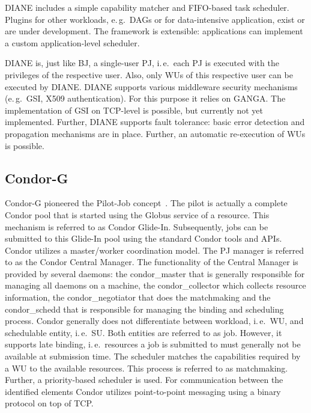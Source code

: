 \documentclass{sig-alternate}
\begin{document}
DIANE includes a simple capability matcher and FIFO-based task scheduler.
Plugins for other workloads, e.\,g.\ DAGs or for data-intensive
application, exist or are under development. The framework is extensible:
applications can implement a custom application-level scheduler.


DIANE is, just like BJ, a single-user PJ, i.\,e.\ each PJ is executed with the
privileges of the respective user. Also, only WUs of this respective user can be
executed by DIANE. DIANE supports various middleware security mechanisms
(e.\,g.\ GSI, X509 authentication). For this purpose it relies on GANGA. The
implementation of GSI on TCP-level is possible, but currently not yet
implemented. Further, DIANE supports fault tolerance: basic error detection and
propagation mechanisms are in place. Further, an automatic re-execution of WUs
is possible.

\subsection{Condor-G}
Condor-G pioneered the Pilot-Job concept~\cite{condor-g}. The pilot is
actually a complete Condor pool that is started using the Globus
service of a resource. This mechanism is referred to as Condor
Glide-In. Subsequently, jobs can be submitted to this Glide-In pool
using the standard Condor tools and APIs. Condor utilizes a
master/worker coordination model. The PJ manager is referred to as the
Condor Central Manager. The functionality of the Central Manager is
provided by several daemons: the condor\_master that is generally
responsible for managing all daemons on a machine, the
condor\_collector which collects resource information, the
condor\_negotiator that does the matchmaking and the condor\_schedd
that is responsible for managing the binding and scheduling
process. Condor generally does not differentiate between workload,
i.\,e.\ WU, and schedulable entity, i.\,e.\ SU. Both entities are
referred to as job. However, it supports late binding, i.\,e.\
resources a job is submitted to must generally not be available at
submission time. The scheduler matches the capabilities required by a
WU to the available resources. This process is referred to as
matchmaking. Further, a priority-based scheduler is used. For
communication between the identified elements Condor utilizes
point-to-point messaging using a binary protocol on top of TCP.
\end{document}
